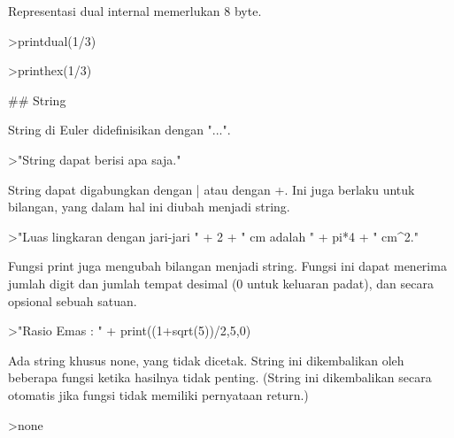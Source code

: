 \documentclass[a4paper,10pt]{article}
\begin{document}
\begin{eulernotebook}
\begin{euleroutput}
  Representasi dual internal memerlukan 8 byte.
  
\end{euleroutput}
\begin{eulerprompt}
>printdual(1/3)
\end{eulerprompt}
\begin{euleroutput}
  
\end{euleroutput}
\begin{eulerprompt}
>printhex(1/3)
\end{eulerprompt}
\begin{euleroutput}
  
  ## String
  
  String di Euler didefinisikan dengan "...".
  
\end{euleroutput}
\begin{eulerprompt}
>"String dapat berisi apa saja."
\end{eulerprompt}
\begin{euleroutput}
  
  String dapat digabungkan dengan | atau dengan +. Ini juga berlaku untuk bilangan, yang dalam hal ini diubah menjadi string.
  
\end{euleroutput}
\begin{eulerprompt}
>"Luas lingkaran dengan jari-jari " + 2 + " cm adalah " + pi*4 + " cm^2."
\end{eulerprompt}
\begin{euleroutput}
  
  Fungsi print juga mengubah bilangan menjadi string. Fungsi ini dapat menerima jumlah digit dan jumlah tempat desimal (0 untuk keluaran padat), dan secara opsional sebuah satuan.
  
\end{euleroutput}
\begin{eulerprompt}
>"Rasio Emas : " + print((1+sqrt(5))/2,5,0)
\end{eulerprompt}
\begin{euleroutput}
  
  Ada string khusus none, yang tidak dicetak. String ini dikembalikan oleh beberapa fungsi ketika hasilnya tidak penting. (String ini dikembalikan secara otomatis jika fungsi tidak memiliki pernyataan return.)
  
\end{euleroutput}
\begin{eulerprompt}
>none
\end{eulerprompt}
\begin{euleroutput}
  

\end{euleroutput}
\end{eulernotebook}
\end{document}

